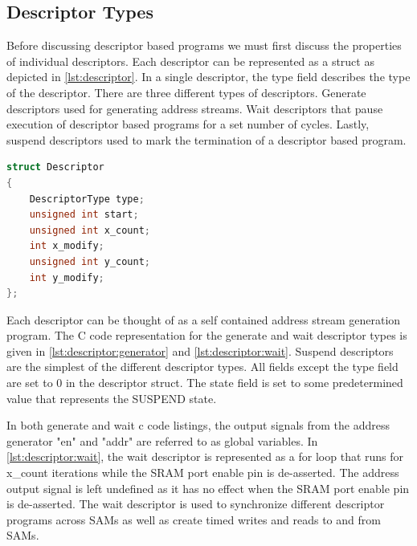 \subsection{Descriptor Types}
\label{chap:data_orchestration:sams:descriptor_types}


Before discussing descriptor based programs we must first discuss the properties
of individual descriptors. Each descriptor can be represented as a struct as
depicted in \autoref{lst:descriptor}. In a single descriptor, the type field
describes the type of the descriptor. There are three different types of
descriptors. Generate descriptors used for generating address streams. Wait descriptors that
pause execution of descriptor based programs for a set number of cycles. Lastly,
suspend descriptors used to mark the termination of a descriptor based program.

\begin{lstlisting}[language=C, caption=Descriptor Struct, label={lst:descriptor}]
struct Descriptor
{
    DescriptorType type; 
    unsigned int start;
    unsigned int x_count;
    int x_modify;
    unsigned int y_count;
    int y_modify;
};
\end{lstlisting}

Each descriptor can be thought of as a self contained address stream generation
program. The C code representation for the generate and wait descriptor types is
given in \autoref{lst:descriptor:generator} and \autoref{lst:descriptor:wait}.
Suspend descriptors are the simplest of the different descriptor types. All
fields except the type field are set to 0 in the descriptor struct. The state
field is set to some predetermined value that represents the SUSPEND state.

In both generate and wait c code listings, the output signals from the address
generator "en" and "addr" are referred to as global variables. In
\autoref{lst:descriptor:wait}, the wait descriptor is represented as a for loop
that runs for x\_count iterations while the SRAM port enable pin is de-asserted.
The address output signal is left undefined as it has no effect when the SRAM
port enable pin is de-asserted. 
The wait descriptor is used to synchronize different descriptor programs across
SAMs as well as create timed writes and reads to and from SAMs.



